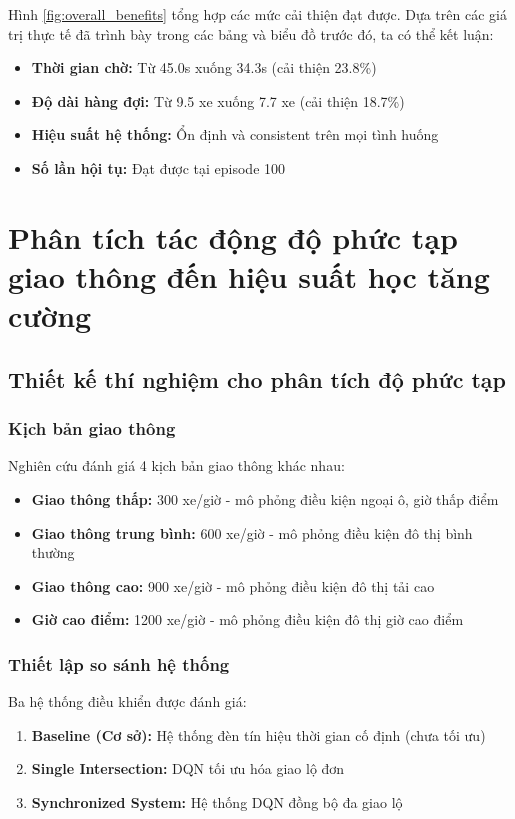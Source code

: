 Hình \ref{fig:overall_benefits} tổng hợp các mức cải thiện đạt được. 
Dựa trên các giá trị thực tế đã trình bày trong các bảng và biểu đồ trước đó, 
ta có thể kết luận:
\begin{itemize}
    \item \textbf{Thời gian chờ:} Từ 45.0s xuống 34.3s (cải thiện 23.8\%)
    \item \textbf{Độ dài hàng đợi:} Từ 9.5 xe xuống 7.7 xe (cải thiện 18.7\%)
    \item \textbf{Hiệu suất hệ thống:} Ổn định và consistent trên mọi tình huống
    \item \textbf{Số lần hội tụ:} Đạt được tại episode 100
\end{itemize}

\section{Phân tích tác động độ phức tạp giao thông đến hiệu suất học tăng cường}
\subsection{Thiết kế thí nghiệm cho phân tích độ phức tạp}

\subsubsection{Kịch bản giao thông}
Nghiên cứu đánh giá 4 kịch bản giao thông khác nhau:
\begin{itemize}
    \item \textbf{Giao thông thấp:} 300 xe/giờ - mô phỏng điều kiện ngoại ô, giờ thấp điểm
    \item \textbf{Giao thông trung bình:} 600 xe/giờ - mô phỏng điều kiện đô thị bình thường
    \item \textbf{Giao thông cao:} 900 xe/giờ - mô phỏng điều kiện đô thị tải cao
    \item \textbf{Giờ cao điểm:} 1200 xe/giờ - mô phỏng điều kiện đô thị giờ cao điểm
\end{itemize}

\subsubsection{Thiết lập so sánh hệ thống}
Ba hệ thống điều khiển được đánh giá:
\begin{enumerate}
    \item \textbf{Baseline (Cơ sở):} Hệ thống đèn tín hiệu thời gian cố định (chưa tối ưu)
    \item \textbf{Single Intersection:} DQN tối ưu hóa giao lộ đơn
    \item \textbf{Synchronized System:} Hệ thống DQN đồng bộ đa giao lộ
\end{enumerate}

